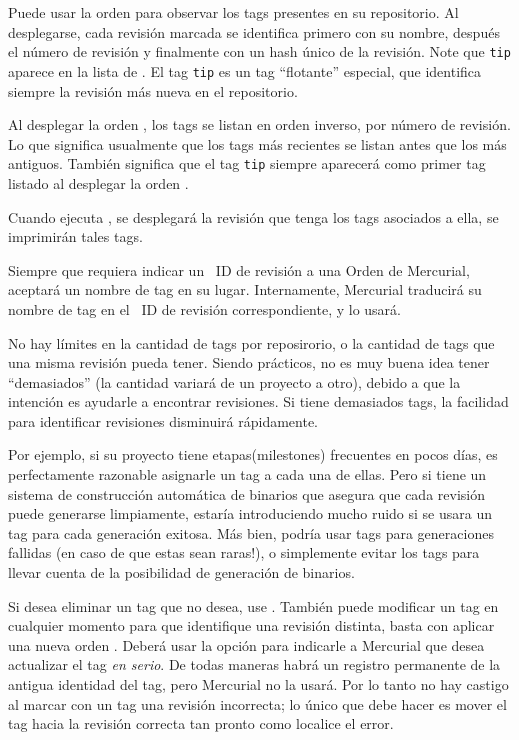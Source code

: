 Puede usar la orden  para observar los tags presentes en
su repositorio. Al desplegarse, cada revisión marcada se identifica
primero con su nombre, después el número de revisión y finalmente con
un hash único de la revisión.
Note que \texttt{tip} aparece en la lista de .  El tag
\texttt{tip} es un tag ``flotante'' especial, que identifica siempre
la revisión más nueva en el repositorio.

Al desplegar la orden , los tags se listan en orden
inverso, por número de revisión. Lo que significa usualmente que los
tags más recientes se listan antes que los más antiguos. También
significa que el tag \texttt{tip} siempre aparecerá como primer tag
listado al desplegar la orden .

Cuando ejecuta , se desplegará la revisión que tenga los
tags asociados a ella, se imprimirán tales tags.

Siempre que requiera indicar un ~ID de revisión a una Orden de
Mercurial, aceptará un nombre de tag en su lugar.  Internamente,
Mercurial traducirá su nombre de tag en el ~ID de revisión
correspondiente, y lo usará.

No hay límites en la cantidad de tags por reposirorio, o la cantidad
de tags que una misma revisión pueda tener. Siendo prácticos, no es
muy buena idea tener ``demasiados'' (la cantidad variará de un
proyecto a otro), debido a que la intención es ayudarle a encontrar
revisiones. Si tiene demasiados tags, la facilidad para identificar
revisiones disminuirá rápidamente.

Por ejemplo, si su proyecto tiene etapas(milestones) frecuentes en pocos
días, es perfectamente razonable asignarle un tag a cada una de
ellas. Pero si tiene un sistema de construcción automática de binarios
que asegura que cada revisión puede generarse limpiamente, estaría
introduciendo mucho ruido si se usara un tag para cada generación
exitosa. Más bien, podría usar tags para generaciones fallidas (en
caso de que estas sean raras!), o simplemente evitar los tags para
llevar cuenta de la posibilidad de generación de binarios.


Si desea eliminar un tag que no desea, use
.  
También puede modificar un tag en cualquier momento para que
identifique una revisión distinta, basta con aplicar una nueva orden
. Deberá usar la opción  para indicarle a
Mercurial que desea actualizar el tag \emph{en serio}.
De todas maneras habrá un registro permanente de la antigua identidad
del tag, pero Mercurial no la usará. Por lo tanto no hay castigo al
marcar con un tag una revisión incorrecta; lo único que debe hacer es
mover el tag hacia la revisión correcta tan pronto como localice el
error.

